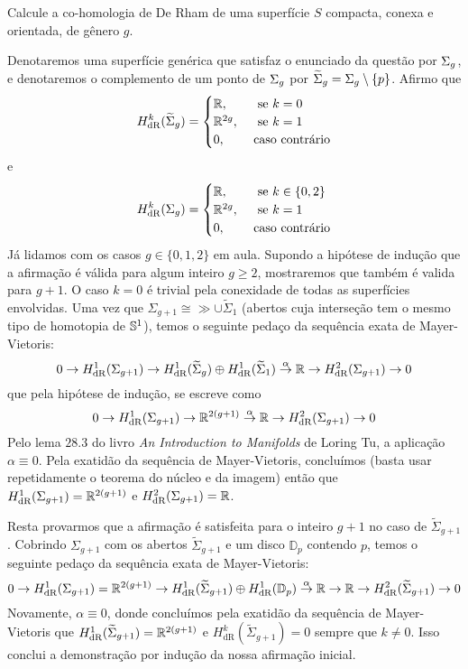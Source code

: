 \begin{Mybox}
Calcule a co-homologia de De Rham de uma superfície $S$ compacta, conexa e orientada, de gênero $g$.
\vspace{-.4cm}
\end{Mybox}
\vspace{-.4cm}

\begin{dem}
Denotaremos uma superfície genérica que satisfaz o enunciado da questão por $\g$, e denotaremos o complemento de um ponto de $\g$ por $\gg = \g \setminus \{p\}$. Afirmo que
$$
H_{\text{dR}}^k(\gg) =\begin{cases}
\R, & \ \text{ se $ k = 0 $} \\
\R^{2g}, & \ \text{ se $k=1$} \\
0, & \ \text{caso contrário}
\end{cases}
$$
e
$$
H_{\text{dR}}^k(\g) =\begin{cases}
\R, & \ \text{ se $ k \in \{0, 2\} $} \\
\R^{2g}, & \ \text{ se $k=1$} \\
0, & \ \text{caso contrário}
\end{cases}
$$
Já lidamos com os casos $g \in \{0, 1, 2\}$ em aula. Supondo a hipótese de indução que a afirmação é válida para algum inteiro $g \geq 2$, mostraremos que também é valida para $g +1$. O caso $k = 0$ é trivial pela conexidade de todas as superfícies envolvidas. Uma vez que $\Sigma_{g+1} \cong \gg \cup \widetilde{\Sigma}_{1}$ (abertos cuja interseção tem o mesmo tipo de homotopia de $\S^1$), temos o seguinte pedaço da sequência exata de Mayer-Vietoris:
\[ 
0 \to H^1_{\text{dR}}(\Sigma_{g+1}) \to H^1_{\text{dR}}(\widetilde{\Sigma}_g) \oplus H^1_{\text{dR}}(\widetilde{\Sigma}_1) \overset{\alpha}{\to} \R \to H^2_{\text{dR}}(\Sigma_{g+1}) \to 0
\]
que pela hipótese de indução, se escreve como
\[
0 \to H^1_{\text{dR}}(\Sigma_{g+1}) \to \R^{2(g+1)} \overset{\alpha}{\to} \R \to H^2_{\text{dR}}(\Sigma_{g+1}) \to 0
\]
Pelo lema $28.3$ do livro \emph{An Introduction to Manifolds} de Loring Tu, a aplicação $\alpha \equiv 0$. Pela exatidão da sequência de Mayer-Vietoris, concluímos (basta usar repetidamente o teorema do núcleo e da imagem) então que $H^1_{\text{dR}}(\Sigma_{g+1}) = \R^{2(g+1)}$ e $H^2_{\text{dR}}(\Sigma_{g+1}) = \R$. \par 
Resta provarmos que a afirmação é satisfeita para o inteiro $g + 1$ no caso de $\widetilde{\Sigma}_{g+1}$. Cobrindo $\Sigma_{g+1}$ com os abertos $\widetilde{\Sigma}_{g+1}$ e um disco $\mathbb{D}_p$ contendo $p$, temos o seguinte pedaço da sequência exata de Mayer-Vietoris:
\[
0 \to H^1_{\text{dR}}(\Sigma_{g+1}) = \R^{2(g+1)} \to H^1_{\text{dR}}(\widetilde{\Sigma}_{g+1}) \oplus H^1_{\text{dR}}(\mathbb{D}_p) \overset{\alpha}{\to} \R \to \R \to H^2_{\text{dR}}(\widetilde{\Sigma}_{g+1}) \to 0
\]
Novamente, $\alpha \equiv 0$, donde concluímos pela exatidão da sequência de Mayer-Vietoris que $H^1_{\text{dR}}(\widetilde{\Sigma}_{g+1}) = \R^{2(g+1)}$ e $H^k_{\text{dR}}(\widetilde{\Sigma}_{g+1}) = 0$ sempre que $k \neq 0$. Isso conclui a demonstração por indução da nossa afirmação inicial.
\end{dem}

